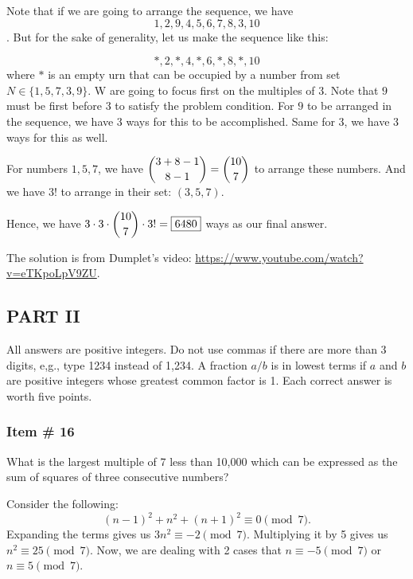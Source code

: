 \documentclass[11pt,paper=letter]{scrartcl}
\begin{document}
\sol

Note that if we are going to arrange the sequence, we have $$ 1, 2, 9, 4, 5, 6, 7, 8, 3, 10 $$. But for the sake of generality, let us make the sequence like this:

$$ *, 2, *, 4, *, 6, *, 8, *, 10 $$ where $*$ is an empty urn that can be occupied by a number from set $N \in \{1,5,7,3,9\}$. W are going to focus first on the multiples of 3. Note that $9$ must be first before $3$ to satisfy the problem condition. For $9$ to be arranged in the sequence, we have 3 ways for this to be accomplished. Same for $3$, we have 3 ways for this as well. 

For numbers $1,5,7$, we have $\dbinom{3+8-1}{8-1} = \dbinom{10}{7}$ to arrange these numbers. And we have $3!$ to arrange in their set: $(3,5,7)$. 

Hence, we have $3 \cdot 3 \cdot \dbinom{10}{7} \cdot 3! = \fbox{6480}$ ways as our final answer.

\begin{mdframed}
\begin{rem}
The solution is from Dumplet's video: \url{https://www.youtube.com/watch?v=eTKpoLpV9ZU}.
\end{rem}
\end{mdframed}

\newpage

\subsection{PART II}

All answers are positive integers. Do not use commas if there are more than 3 digits, e,g., type 1234 instead of 1,234. A fraction $a/b$ is in lowest terms if $a$ and $b$ are positive integers whose greatest common factor is 1. Each correct answer is worth five points. 

\subsubsection{Item \# 16}

\begin{probboxed}
What is the largest multiple of 7 less than 10,000 which can be expressed as the sum of squares of three consecutive numbers?
\end{probboxed}



Consider the following: $$(n-1)^2 + n^2 + (n+1)^2 \equiv 0 \pmod{7}.$$ Expanding the terms gives us $3n^2 \equiv -2 \pmod{7}$. Multiplying it by 5 gives us $n^2 \equiv 25 \pmod{7}$. Now, we are dealing with 2 cases that $n \equiv -5 \pmod{7}$ or $n \equiv 5 \pmod{7}$.
\end{document}
